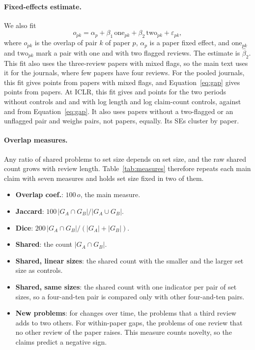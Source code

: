 \documentclass[11pt]{article}
\begin{document}
\paragraph{Fixed-effects estimate.} We also fit
\begin{equation}
 o_{pk}=\alpha_p+\beta_1\,\mathrm{one}_{pk}+\beta_2\,\mathrm{two}_{pk}+\varepsilon_{pk},
\label{eq:fe}
\end{equation}
where $o_{pk}$ is the overlap of pair $k$ of paper $p$, $\alpha_p$ is a paper fixed effect, and $\mathrm{one}_{pk}$ and $\mathrm{two}_{pk}$ mark a pair with one and with two flagged reviews. The estimate is $\hat{\beta}_2$. This fit also uses the three-review papers with mixed flags, so the main text uses it for the journals, where few papers have four reviews. For the pooled journals, this fit gives \JournalGap{} points from \JournalGapVarying{} papers with mixed flags, and Equation~\ref{eq:gap} gives \IdJournalDirect{} points from \IdJournalDirectN{} papers. At ICLR, this fit gives \FeGapEarly{} and \FeGapLate{} points for the two periods without controls and \ControlGapEarly{} and \ControlGapLate{} with log length and log claim-count controls, against \FlagGapEarly{} and \FlagGapLate{} from Equation~\ref{eq:gap}. It also uses papers without a two-flagged or an unflagged pair and weighs pairs, not papers, equally. Its SEs cluster by paper.

\paragraph{Overlap measures.} Any ratio of shared problems to set size depends on set size, and the raw shared count grows with review length. Table~\ref{tab:measures} therefore repeats each main claim with seven measures and holds set size fixed in two of them.

\begin{itemize}[nosep]
\item \textbf{Overlap coef.}: $100\,o$, the main measure.
\item \textbf{Jaccard}: $100\,|G_A\cap G_B|/|G_A\cup G_B|$.
\item \textbf{Dice}: $200\,|G_A\cap G_B|/(|G_A|+|G_B|)$.
\item \textbf{Shared}: the count $|G_A\cap G_B|$.
\item \textbf{Shared, linear sizes}: the shared count with the smaller and the larger set size as controls.
\item \textbf{Shared, same sizes}: the shared count with one indicator per pair of set sizes, so a four-and-ten pair is compared only with other four-and-ten pairs.
\item \textbf{New problems}: for changes over time, the problems that a third review adds to two others. For within-paper gaps, the problems of one review that no other review of the paper raises. This measure counts novelty, so the claims predict a negative sign.
\end{itemize}
\end{document}
